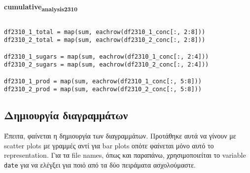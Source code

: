 \documentclass[11pt]{article}
\begin{document}
\textbf{cumulative\textsubscript{analysis}\textsubscript{23}\textsubscript{10}}
\begin{verbatim}

df2310_1_total = map(sum, eachrow(df2310_1_conc[:, 2:8]))
df2310_2_total = map(sum, eachrow(df2310_2_conc[:, 2:8]))

df2310_1_sugars = map(sum, eachrow(df2310_1_conc[:, 2:4]))
df2310_2_sugars = map(sum, eachrow(df2310_2_conc[:, 2:4]))

df2310_1_prod = map(sum, eachrow(df2310_1_conc[:, 5:8]))
df2310_2_prod = map(sum, eachrow(df2310_2_conc[:, 5:8]))

\end{verbatim}

\subsection{Δημιουργία διαγραμμάτων}
\label{sec:orgc99b089}
Έπειτα, φαίνεται η δημιουργία των διαγραμμάτων. Προτάθηκε αυτά να γίνουν με scatter plots με γραμμές αντί για bar plots οπότε φαίνεται μόνο αυτό το representation. Για τα file names, όπως και παραπάνω, χρησιμοποιείται το variable \texttt{date} για να ελέγξει για ποιό από τα δύο πειράματα ασχολούμαστε.
\end{document}
